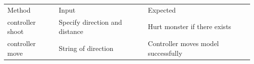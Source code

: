 \documentclass[12pt]{amsart}
\begin{document}
\newpage

\begin{table}[htbp]
   \begin{tabular}{@{} lll @{}} %

      Method     & Input & Expected \\
         controller shoot & Specify direction and distance & Hurt monster if there exists\\
         controller move & String of direction & Controller moves model successfully\\

    \end{tabular}
\end{table}

\newpage
\end{document}
